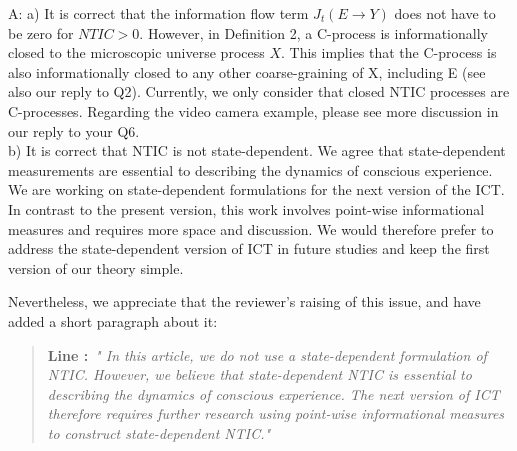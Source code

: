 \documentclass[utf8]{article}
\newenvironment{ans}  
    {\color{Black}\noindent A:}
    {~\newline}
\newcommand{\addnew}[2]{\blockcquote{}{\textbf{Line #1:}~\newline\textit{"#2"}}
}
\begin{document}
    	\begin{ans}
    		\newline
    		a) It is correct that the information flow term $J_t(E\rightarrow Y)$ does not have to be zero for $NTIC>0$. However, in Definition 2, a C-process is informationally closed to the microscopic universe process $X$. This implies that the C-process is also informationally closed to any other coarse-graining of X, including E (see also our reply to Q2). Currently, we only consider that closed NTIC processes are C-processes. 
    		Regarding the video camera example, please see more discussion in our reply to your Q6. \\
    		

            		
    		\noindent
    		b) It is correct that NTIC is not state-dependent. We agree that state-dependent measurements are essential to describing the dynamics of conscious experience. We are working on state-dependent formulations for the next version of the ICT. In contrast to the present version, this work involves point-wise informational measures and requires more space and discussion. We would therefore prefer to address the state-dependent version of ICT in future studies and keep the first version of our theory simple.
    		
    		Nevertheless, we appreciate that the reviewer’s raising of this issue, and have added a short paragraph about it:
    		
    	
	    	\addnew{}{
	    		In this article, we do not use a state-dependent formulation of NTIC. However, we believe that state-dependent NTIC is essential to describing the dynamics of conscious experience. The next version of ICT therefore requires further research using point-wise informational measures to construct state-dependent NTIC.}
    	\end{ans}
        
\end{document}
